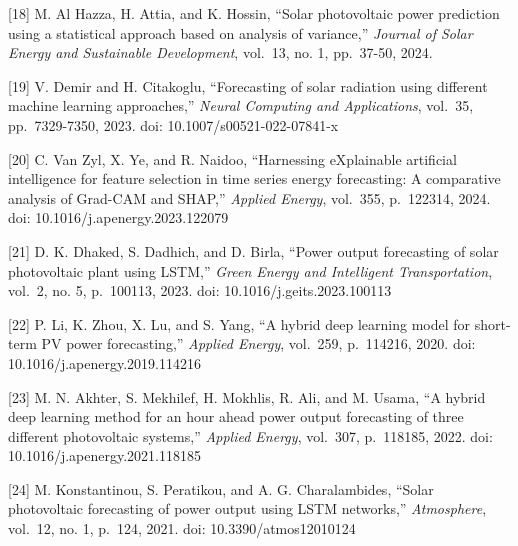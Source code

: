\documentclass[
  11pt,
]{article}
\begin{document}
{[}18{]} M. Al Hazza, H. Attia, and K. Hossin, “Solar photovoltaic power
prediction using a statistical approach based on analysis of variance,”
\emph{Journal of Solar Energy and Sustainable Development}, vol.~13, no.
1, pp.~37-50, 2024.

{[}19{]} V. Demir and H. Citakoglu, “Forecasting of solar radiation
using different machine learning approaches,” \emph{Neural Computing and
Applications}, vol.~35, pp.~7329-7350, 2023. doi:
10.1007/s00521-022-07841-x

{[}20{]} C. Van Zyl, X. Ye, and R. Naidoo, “Harnessing eXplainable
artificial intelligence for feature selection in time series energy
forecasting: A comparative analysis of Grad-CAM and SHAP,” \emph{Applied
Energy}, vol.~355, p.~122314, 2024. doi: 10.1016/j.apenergy.2023.122079

{[}21{]} D. K. Dhaked, S. Dadhich, and D. Birla, “Power output
forecasting of solar photovoltaic plant using LSTM,” \emph{Green Energy
and Intelligent Transportation}, vol.~2, no. 5, p.~100113, 2023. doi:
10.1016/j.geits.2023.100113

{[}22{]} P. Li, K. Zhou, X. Lu, and S. Yang, “A hybrid deep learning
model for short-term PV power forecasting,” \emph{Applied Energy},
vol.~259, p.~114216, 2020. doi: 10.1016/j.apenergy.2019.114216

{[}23{]} M. N. Akhter, S. Mekhilef, H. Mokhlis, R. Ali, and M. Usama, “A
hybrid deep learning method for an hour ahead power output forecasting
of three different photovoltaic systems,” \emph{Applied Energy},
vol.~307, p.~118185, 2022. doi: 10.1016/j.apenergy.2021.118185

{[}24{]} M. Konstantinou, S. Peratikou, and A. G. Charalambides, “Solar
photovoltaic forecasting of power output using LSTM networks,”
\emph{Atmosphere}, vol.~12, no. 1, p.~124, 2021. doi:
10.3390/atmos12010124
\end{document}
